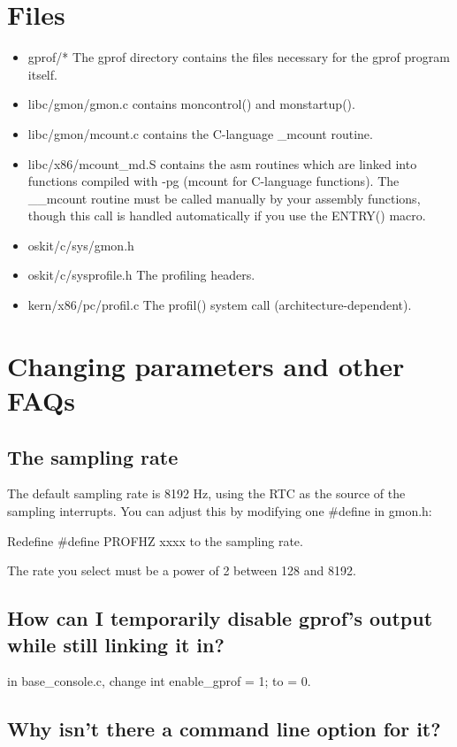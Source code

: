 \section{Files}
\begin{itemize}
	\item{gprof/*}
		The gprof directory contains the files necessary for
		the gprof program itself.
	\item{libc/gmon/gmon.c}
		contains moncontrol() and monstartup().
	\item{libc/gmon/mcount.c}
		contains the C-language \_mcount routine.
	\item{libc/x86/mcount_md.S}
		contains the asm routines which are linked into
		functions compiled with -pg (mcount for C-language
		functions).  The \_\_mcount routine must be called
		manually by your assembly functions, though this call
		is handled automatically if you use the ENTRY() macro.
	\item{oskit/c/sys/gmon.h}
	\item{oskit/c/sysprofile.h}
		The profiling headers.
	\item{kern/x86/pc/profil.c}
		The profil() system call (architecture-dependent).
\end{itemize}


\section{Changing parameters and other FAQs}


\subsection{The sampling rate}

	The default sampling rate is 8192 Hz, using the RTC as the source
	of the sampling interrupts.  You can adjust this by modifying
	one \#define in gmon.h:

	   Redefine \#define PROFHZ xxxx   to the sampling rate.

	The rate you select must be a power of 2 between 128 and 8192.

\subsection{How can I temporarily disable gprof's output while still linking it in?}

     in base_console.c, change int enable\_gprof = 1;  to = 0.

\subsection{Why isn't there a command line option for it?}

